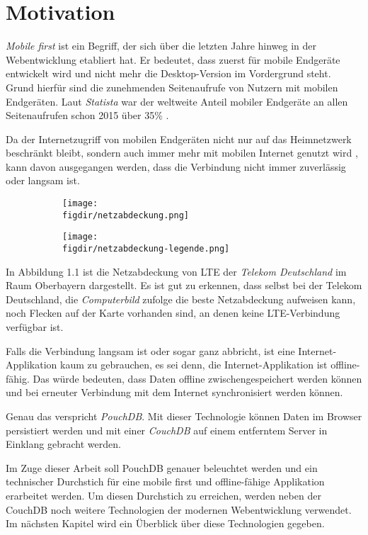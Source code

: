 \chapter{Motivation}
\label{Motivation}

\emph{Mobile first} ist ein Begriff, der sich über die letzten Jahre hinweg in der Webentwicklung etabliert hat. Er bedeutet, dass zuerst für mobile Endgeräte entwickelt wird und nicht mehr die Desktop-Version im Vordergrund steht. Grund hierfür sind die zunehmenden Seitenaufrufe von Nutzern mit mobilen Endgeräten. Laut \emph{Statista} war der weltweite Anteil mobiler Endgeräte an allen Seitenaufrufen schon 2015 über 35\% \cite{statista}.

Da der Internetzugriff von mobilen Endgeräten nicht nur auf das Heimnetzwerk beschränkt bleibt, sondern auch immer mehr mit mobilen Internet genutzt wird \cite{statista:datenverkehr}, kann davon ausgegangen werden, dass die Verbindung nicht immer zuverlässig oder langsam ist.
\begin{figure}[H]
\centering
\caption{LTE Abdeckung der Telekom Deutschland im Raum Oberbayern}
\label{fig:netzabdeckung}
\begin{subfigure}{0.79\textwidth}
\texttt{[image: \\figdir/netzabdeckung.png]}
\end{subfigure}
\begin{subfigure}{0.2\textwidth}
\texttt{[image: \\figdir/netzabdeckung-legende.png]}
\end{subfigure}
\end{figure}

In Abbildung 1.1 ist die Netzabdeckung von LTE der \emph{Telekom Deutschland} im Raum Oberbayern dargestellt. Es ist gut zu erkennen, dass selbst bei der Telekom Deutschland, die \emph{Computerbild} zufolge \cite{computerbild} die beste Netzabdeckung aufweisen kann, noch Flecken auf der Karte vorhanden sind, an denen keine LTE-Verbindung verfügbar ist.

Falls die Verbindung langsam ist oder sogar ganz abbricht, ist eine Internet-Applikation kaum zu gebrauchen, es sei denn, die Internet-Applikation ist offline-fähig. Das würde bedeuten, dass Daten offline zwischengespeichert werden können und bei erneuter Verbindung mit dem Internet synchronisiert werden können.

Genau das verspricht \emph{PouchDB}. Mit dieser Technologie können Daten im Browser persistiert werden und mit einer \emph{CouchDB} auf einem entferntem Server in Einklang gebracht werden.

Im Zuge dieser Arbeit soll PouchDB genauer beleuchtet werden und ein technischer Durchstich für eine mobile first und offline-fähige Applikation erarbeitet werden. Um diesen Durchstich zu erreichen, werden neben der CouchDB noch weitere Technologien der modernen Webentwicklung verwendet. Im nächsten Kapitel wird ein Überblick über diese Technologien gegeben.

